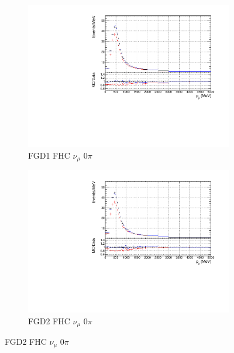 \begin{figure}
\begin{subfigure}{0.49\textwidth}
  \centering
  \includegraphics[width=\textwidth]{figs/priorpred1D_p_FGD1_numuCC_0pi}
  \caption{FGD1 FHC $\nu_{\mu}$ 0$\pi$}
\end{subfigure}
\begin{subfigure}{0.49\textwidth}
  \centering
  \includegraphics[width=\textwidth]{figs/priorpred1D_p_FGD2_numuCC_0pi}
  \caption{FGD2 FHC $\nu_{\mu}$ 0$\pi$}
\end{subfigure}


\end{figure}
